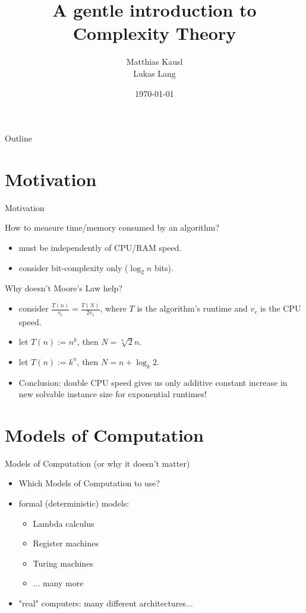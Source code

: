\documentclass[c]{beamer}
\title{A gentle introduction to Complexity Theory}
\author{Matthias Kausl \\ Lukas Lang}
\institute{Vienna University of Technology}
\date{\today}
\begin{document}
\begin{frame}
\titlepage
\end{frame}

\begin{frame}{Outline}
	\tableofcontents
\end{frame}


\section{Motivation}

\begin{frame}{Motivation}
	\begin{block}{How to measure time/memory consumed by an algorithm?}
		\begin{itemize}
			\item must be independently of CPU/RAM speed.
			\item consider bit-complexity only ($\log_{2} n$ bits).
		\end{itemize}
          \end{block}
	\begin{block}{Why doesn't Moore's Law help?}
		\begin{itemize}
			\item consider $\frac{T(n)}{v_{c}} = \frac{T(N)}{2v_{c}}$, where $T$ is the algorithm's runtime and $v_{c}$ is the CPU speed. 
			\item let $T(n) := n^{k}$, then $N = \sqrt[k]{2}n$.
			\item let $T(n) := k^{n}$, then $N = n + \log_{k} 2$.
			\item Conclusion: double CPU speed gives us only additive constant increase in new solvable instance size for exponential runtimes!
		\end{itemize}
          \end{block}
\end{frame}


\section{Models of Computation}
\begin{frame}{Models of Computation (or why it doesn't matter)}
          \begin{itemize}
			\item Which Models of Computation to use?
			\item formal (deterministic) models:
			\begin{itemize}
				\item Lambda calculus
				\item Register machines
				\item Turing machines
				\item ... many more
			\end{itemize}
			\item "real" computers: many different architectures...
		  \end{itemize}
\end{frame}		
\end{document}
